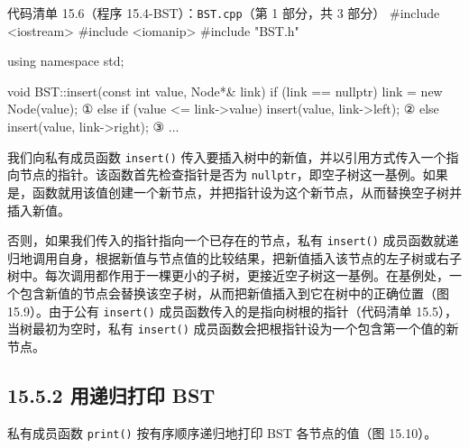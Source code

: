 \begin{codeboxt}{代码清单 15.6（程序 15.4-BST）：\texttt{BST.cpp}（第 1 部分，共 3 部分）}
#include <iostream>
#include <iomanip>
#include "BST.h"

using namespace std;

void BST::insert(const int value, Node*& link)
{
    if      (link == nullptr)      link = new Node(value);     ①
    else if (value <= link->value) insert(value, link->left);  ②
    else                           insert(value, link->right); ③
}
...
\end{codeboxt}
\par
{}\par
{}\par

我们向私有成员函数 \texttt{insert()} 传入要插入树中的新值，并以引用方式传入一个指向节点的指针。该函数首先检查指针是否为 \texttt{nullptr}，即空子树这一基例。如果是，函数就用该值创建一个新节点，并把指针设为这个新节点，从而替换空子树并插入新值。

否则，如果我们传入的指针指向一个已存在的节点，私有 \texttt{insert()} 成员函数就递归地调用自身，根据新值与节点值的比较结果，把新值插入该节点的左子树或右子树中。每次调用都作用于一棵更小的子树，更接近空子树这一基例。在基例处，一个包含新值的节点会替换该空子树，从而把新值插入到它在树中的正确位置（图 15.9）。由于公有 \texttt{insert()} 成员函数传入的是指向树根的指针（代码清单 15.5），当树最初为空时，私有 \texttt{insert()} 成员函数会把根指针设为一个包含第一个值的新节点。


\subsection{15.5.2 用递归打印 BST}

私有成员函数 \texttt{print()} 按有序顺序递归地打印 BST 各节点的值（图 15.10）。


